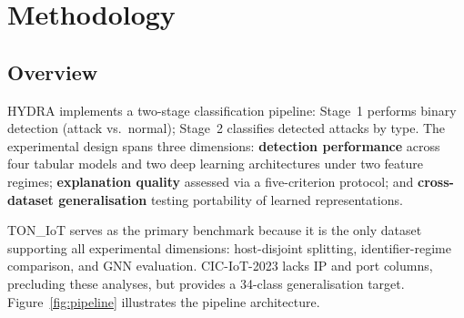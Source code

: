 \documentclass[12pt,a4paper]{report}
\begin{document}
\chapter{Methodology}
\label{ch:methodology}

\section{Overview}
\label{sec:meth-overview}

HYDRA implements a two-stage classification pipeline: Stage~1 performs binary detection (attack vs.\ normal); Stage~2 classifies detected attacks by type. The experimental design spans three dimensions: \textbf{detection performance} across four tabular models and two deep learning architectures under two feature regimes; \textbf{explanation quality} assessed via a five-criterion protocol; and \textbf{cross-dataset generalisation} testing portability of learned representations.

TON\_IoT serves as the primary benchmark because it is the only dataset supporting all experimental dimensions: host-disjoint splitting, identifier-regime comparison, and GNN evaluation. CIC-IoT-2023 lacks IP and port columns, precluding these analyses, but provides a 34-class generalisation target. Figure~\ref{fig:pipeline} illustrates the pipeline architecture.
\end{document}
